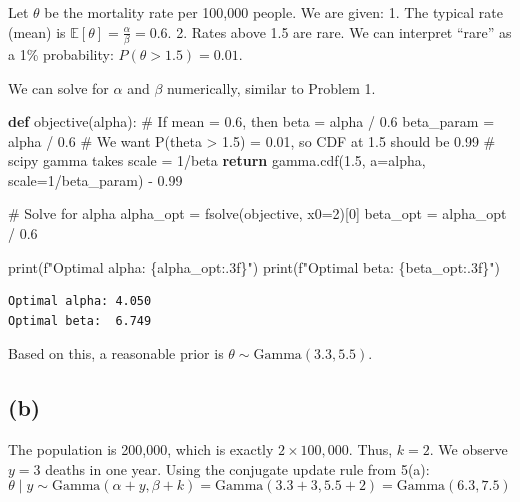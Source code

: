 \documentclass[
  letterpaper,
  DIV=11,
  numbers=noendperiod]{scrartcl}
\newenvironment{Shaded}{\begin{snugshade}}{\end{snugshade}}
\newcommand{\BuiltInTok}[1]{\textcolor[rgb]{0.00,0.23,0.31}{#1}}
\newcommand{\CommentTok}[1]{\textcolor[rgb]{0.37,0.37,0.37}{#1}}
\newcommand{\ControlFlowTok}[1]{\textcolor[rgb]{0.00,0.23,0.31}{\textbf{#1}}}
\newcommand{\DecValTok}[1]{\textcolor[rgb]{0.68,0.00,0.00}{#1}}
\newcommand{\FloatTok}[1]{\textcolor[rgb]{0.68,0.00,0.00}{#1}}
\newcommand{\KeywordTok}[1]{\textcolor[rgb]{0.00,0.23,0.31}{\textbf{#1}}}
\newcommand{\NormalTok}[1]{\textcolor[rgb]{0.00,0.23,0.31}{#1}}
\newcommand{\OperatorTok}[1]{\textcolor[rgb]{0.37,0.37,0.37}{#1}}
\newcommand{\SpecialCharTok}[1]{\textcolor[rgb]{0.37,0.37,0.37}{#1}}
\newcommand{\SpecialStringTok}[1]{\textcolor[rgb]{0.13,0.47,0.30}{#1}}
\begin{document}
Let \(\theta\) be the mortality rate per 100,000 people. We are given:
1. The typical rate (mean) is
\(\mathbb{E}[\theta] = \frac{\alpha}{\beta} = 0.6\). 2. Rates above 1.5
are rare. We can interpret ``rare'' as a 1\% probability:
\(P(\theta > 1.5) = 0.01\).

We can solve for \(\alpha\) and \(\beta\) numerically, similar to
Problem 1.

\begin{Shaded}
\begin{Highlighting}[]
\KeywordTok{def}\NormalTok{ objective(alpha):}
    \CommentTok{\# If mean = 0.6, then beta = alpha / 0.6}
\NormalTok{    beta\_param }\OperatorTok{=}\NormalTok{ alpha }\OperatorTok{/} \FloatTok{0.6}
    \CommentTok{\# We want P(theta \textgreater{} 1.5) = 0.01, so CDF at 1.5 should be 0.99}
    \CommentTok{\# scipy gamma takes scale = 1/beta}
    \ControlFlowTok{return}\NormalTok{ gamma.cdf(}\FloatTok{1.5}\NormalTok{, a}\OperatorTok{=}\NormalTok{alpha, scale}\OperatorTok{=}\DecValTok{1}\OperatorTok{/}\NormalTok{beta\_param) }\OperatorTok{{-}} \FloatTok{0.99}

\CommentTok{\# Solve for alpha}
\NormalTok{alpha\_opt }\OperatorTok{=}\NormalTok{ fsolve(objective, x0}\OperatorTok{=}\DecValTok{2}\NormalTok{)[}\DecValTok{0}\NormalTok{]}
\NormalTok{beta\_opt }\OperatorTok{=}\NormalTok{ alpha\_opt }\OperatorTok{/} \FloatTok{0.6}

\BuiltInTok{print}\NormalTok{(}\SpecialStringTok{f"Optimal alpha: }\SpecialCharTok{\{}\NormalTok{alpha\_opt}\SpecialCharTok{:.3f\}}\SpecialStringTok{"}\NormalTok{)}
\BuiltInTok{print}\NormalTok{(}\SpecialStringTok{f"Optimal beta:  }\SpecialCharTok{\{}\NormalTok{beta\_opt}\SpecialCharTok{:.3f\}}\SpecialStringTok{"}\NormalTok{)}
\end{Highlighting}
\end{Shaded}

\begin{verbatim}
Optimal alpha: 4.050
Optimal beta:  6.749
\end{verbatim}

Based on this, a reasonable prior is
\(\theta \sim \text{Gamma}(3.3, 5.5)\).

\subsection{(b)}\label{b-4}

The population is 200,000, which is exactly \(2 \times 100,000\). Thus,
\(k = 2\). We observe \(y = 3\) deaths in one year. Using the conjugate
update rule from 5(a): \[
\theta \mid y \sim \text{Gamma}(\alpha + y, \beta + k) = \text{Gamma}(3.3 + 3, 5.5 + 2) = \text{Gamma}(6.3, 7.5)
\]
\end{document}

